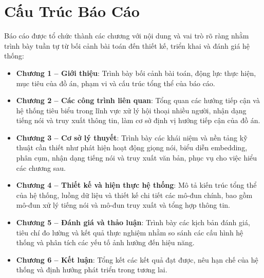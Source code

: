 \section{Cấu Trúc Báo Cáo}

Báo cáo được tổ chức thành các chương với nội dung và vai trò rõ ràng nhằm trình bày tuần tự từ bối cảnh bài toán đến thiết kế, triển khai và đánh giá hệ thống:
\begin{itemize}[label={}]
    \item \textbf{Chương 1 – Giới thiệu}: Trình bày bối cảnh bài toán, động lực thực hiện, mục tiêu của đồ án, phạm vi và cấu trúc tổng thể của báo cáo.
    \item \textbf{Chương 2 – Các công trình liên quan}: Tổng quan các hướng tiếp cận và hệ thống tiêu biểu trong lĩnh vực xử lý hội thoại nhiều người, nhận dạng tiếng nói và truy xuất thông tin, làm cơ sở định vị hướng tiếp cận của đồ án.
    \item \textbf{Chương 3 – Cơ sở lý thuyết}: Trình bày các khái niệm và nền tảng kỹ thuật cần thiết như phát hiện hoạt động giọng nói, biểu diễn embedding, phân cụm, nhận dạng tiếng nói và truy xuất văn bản, phục vụ cho việc hiểu các chương sau.
    \item \textbf{Chương 4 – Thiết kế và hiện thực hệ thống}: Mô tả kiến trúc tổng thể của hệ thống, luồng dữ liệu và thiết kế chi tiết các mô-đun chính, bao gồm mô-đun xử lý tiếng nói và mô-đun truy xuất và tổng hợp thông tin.
    \item \textbf{Chương 5 – Đánh giá và thảo luận}: Trình bày các kịch bản đánh giá, tiêu chí đo lường và kết quả thực nghiệm nhằm so sánh các cấu hình hệ thống và phân tích các yếu tố ảnh hưởng đến hiệu năng.
    \item \textbf{Chương 6 – Kết luận}: Tổng kết các kết quả đạt được, nêu hạn chế của hệ thống và định hướng phát triển trong tương lai.
\end{itemize}
